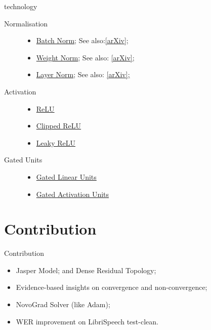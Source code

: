 \documentclass[aspectratio=169,xcolor={dvipsnames,svgnames}]{beamer}
\begin{document}
\begin{frame}[label={sec:technology}]{technology}
\begin{description}
\item[{Normalisation}] \begin{itemize}
\item \hyperlink{sec:batch-norm}{Batch Norm}; See also:\href{https://arxiv.org/abs/1502.03167}{[arXiv];}
\item \hyperlink{sec:weight-norm}{Weight Norm}; See also: \href{http://arxiv.org/abs/1602.07868}{[arXiv];}
\item \hyperlink{sec:layer-norm}{Layer Norm}; See also: \href{http://arxiv.org/abs/1607.06450}{[arXiv];}
\end{itemize}
\item[{Activation}] \begin{itemize}
\item \hyperlink{sec:orgf33426f}{ReLU}
\item \hyperlink{sec:orgf33426f}{Clipped ReLU}
\item \hyperlink{sec:orgf33426f}{Leaky ReLU}
\end{itemize}
\item[{Gated Units}] \begin{itemize}
\item \hyperlink{sec:gated-linear-unit}{Gated Linear Units}
\item \hyperlink{sec:gated-activation-unit}{Gated Activation Units}
\end{itemize}
\end{description}
\end{frame}

\section{Contribution}
\label{sec:org7d6064a}
\begin{frame}[label={sec:contribution}]{Contribution}
\begin{itemize}
\item Jasper Model; and Dense Residual Topology;
\item Evidence-based insights on convergence and
non-convergence;
\item NovoGrad Solver (like Adam);
\item WER improvement on LibriSpeech test-clean.
\end{itemize}
\end{frame}
\end{document}
